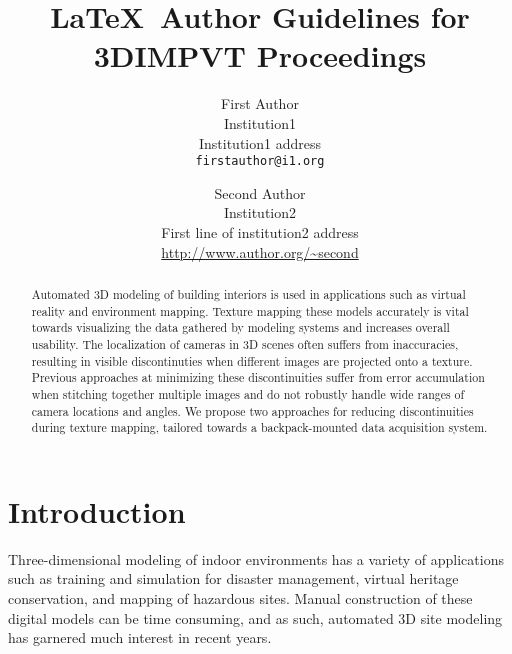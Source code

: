 \documentclass[10pt,twocolumn,letterpaper]{article}
\begin{document}
\title{\LaTeX\ Author Guidelines for 3DIMPVT Proceedings}

\author{First Author\\
  Institution1\\
  Institution1 address\\
  {\tt\small firstauthor@i1.org}
  \and
  Second Author\\
  Institution2\\
  First line of institution2 address\\
  {\small\url{http://www.author.org/~second}} }

\maketitle

\begin{abstract}
  Automated 3D modeling of building interiors is used in applications
  such as virtual reality and environment mapping. Texture mapping
  these models accurately is vital towards visualizing the data
  gathered by modeling systems and increases overall usability. The
  localization of cameras in 3D scenes often suffers from
  inaccuracies, resulting in visible discontinuties when different
  images are projected onto a texture. Previous approaches at
  minimizing these discontinuities suffer from error accumulation when
  stitching together multiple images and do not robustly handle wide
  ranges of camera locations and angles. We propose two approaches for
  reducing discontinuities during texture mapping, tailored towards a
  backpack-mounted data acquisition system.
\end{abstract}

\section{Introduction}
Three-dimensional modeling of indoor environments has a variety of
applications such as training and simulation for disaster management,
virtual heritage conservation, and mapping of hazardous sites. Manual
construction of these digital models can be time consuming, and as
such, automated 3D site modeling has garnered much interest in recent
years.
\end{document}
